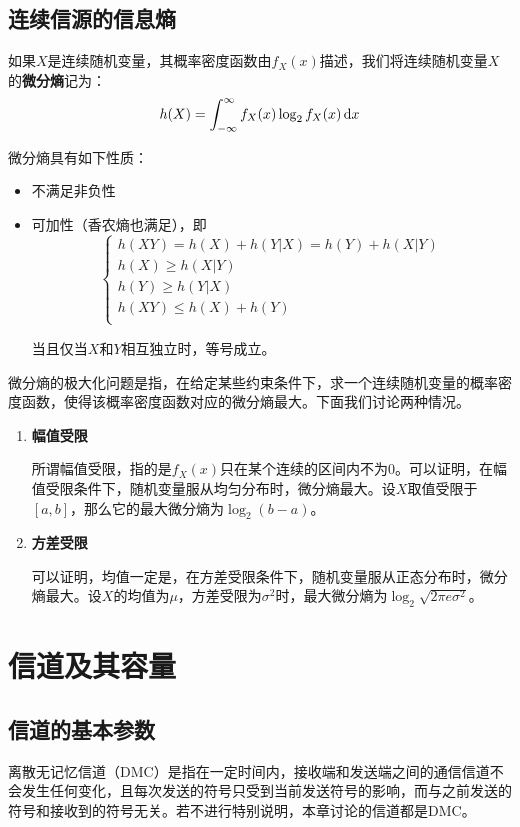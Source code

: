\documentclass[UTF8,a4paper,11pt]{article}
\begin{document}
\subsection{连续信源的信息熵}
如果$X$是连续随机变量，其概率密度函数由$f_X(x)$描述，我们将连续随机变量$X$的\textbf{微分熵}记为：
\begin{equation}
h(X)=\int_{-\infty}^{\infty} {f_X(x)\log_{2}{f_X(x)}} \,{\rm d}x
\end{equation}

微分熵具有如下性质：
\begin{itemize}
\item 不满足非负性
\item 可加性（香农熵也满足），即
\begin{equation}
\begin{cases}
h(XY)=h(X)+h(Y|X)=h(Y)+h(X|Y) \\
h(X)\ge h(X|Y) \\
h(Y)\ge h(Y|X) \\
h(XY)\le h(X)+h(Y) \\
\end{cases}
\end{equation}

当且仅当$X$和$Y$相互独立时，等号成立。
\end{itemize}

微分熵的极大化问题是指，在给定某些约束条件下，求一个连续随机变量的概率密度函数，使得该概率密度函数对应的微分熵最大。下面我们讨论两种情况。

\begin{enumerate}

\item \textbf{幅值受限}

所谓幅值受限，指的是$f_X(x)$只在某个连续的区间内不为0。可以证明，在幅值受限条件下，随机变量服从均匀分布时，微分熵最大。设$X$取值受限于$[a,b]$，那么它的最大微分熵为$\log_{2}{(b-a)}$。

\item \textbf{方差受限}

可以证明，均值一定是，在方差受限条件下，随机变量服从正态分布时，微分熵最大。设$X$的均值为$\mu$，方差受限为$\sigma^2$时，最大微分熵为$\log_{2}{\sqrt{2\pi e\sigma^2}}$。
\end{enumerate}

\section{信道及其容量}
\subsection{信道的基本参数}
离散无记忆信道（DMC）是指在一定时间内，接收端和发送端之间的通信信道不会发生任何变化，且每次发送的符号只受到当前发送符号的影响，而与之前发送的符号和接收到的符号无关。若不进行特别说明，本章讨论的信道都是DMC。
\end{document}
